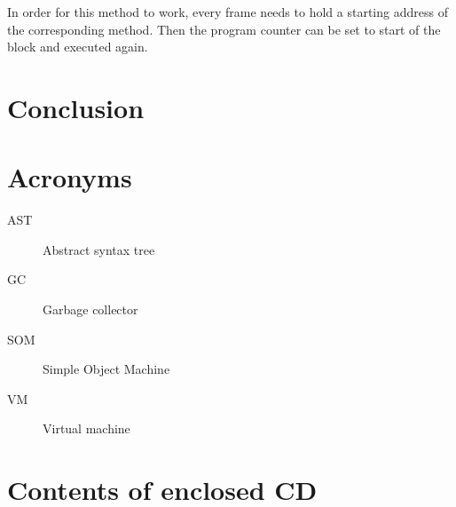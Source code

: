 \documentclass[thesis=M,english]{FITthesis}[2019/12/23]
\begin{document}
In order for this method to work, every frame needs to hold a starting address of the corresponding method. Then the program counter
can be set to start of the block and executed again.

\chapter{Conclusion}





\appendix

\chapter{Acronyms}
\begin{description}
	\item[AST] Abstract syntax tree
	\item[GC] Garbage collector
	\item[SOM] Simple Object Machine 
	\item[VM] Virtual machine 
\end{description}


\chapter{Contents of enclosed CD}


\begin{figure}
\end{figure}
\end{document}
